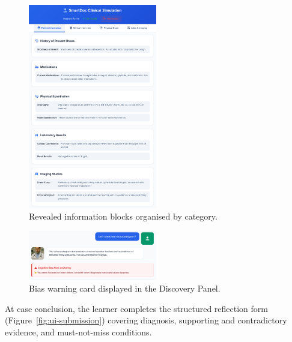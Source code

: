 \begin{figure}[h]
  \centering
  \includegraphics[width=0.5\textwidth]{figures/ui/ui_tabs_anamnesis_exam_results.png}
  \caption{Revealed information blocks organised by category.}
  \label{fig:ui-tabs}
\end{figure}

\begin{figure}[h]
  \centering
  \includegraphics[width=0.5\textwidth]{figures/ui/ui_bias_card.png}
  \caption{Bias warning card displayed in the Discovery Panel.}
  \label{fig:ui-bias-card}
\end{figure}

\newpage

At case conclusion, the learner completes the structured reflection form
(Figure~\ref{fig:ui-submission}) covering diagnosis, supporting and
contradictory evidence, and must-not-miss conditions.

